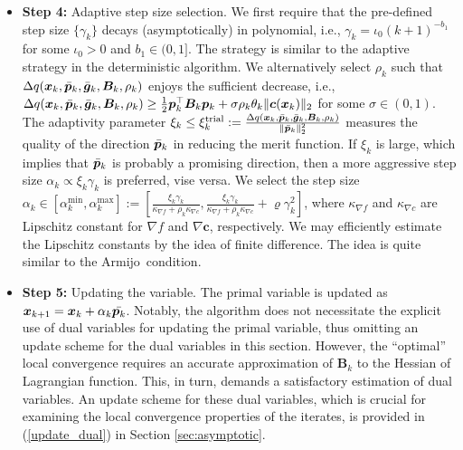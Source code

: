 \documentclass[aos]{imsart}
\numberwithin{equation}{section}
\theoremstyle{plain}
\begin{document}
\begin{itemize}
    \item \textbf{Step 4:} Adaptive step size selection. We first require that the pre-defined step size $\{\gamma_k\}$ decays (asymptotically) in polynomial, i.e., $\gamma_k = \iota_0 \left(k+1 \right)^{-b_1}$ for some $\iota_0 > 0$ and $b_1 \in (0,1]$. 
    The strategy is similar to the adaptive strategy in the deterministic algorithm. We alternatively select $\rho_k$ such that $\Delta q(\bm{x}_k,\Bar{\bm{p}}_k, \Bar{\bm{g}}_k, \bm{B}_k,\rho_k)$ enjoys the sufficient decrease, i.e., $\Delta q(\bm{x}_k,\Bar{\bm{p}}_k, \Bar{\bm{g}}_k, \bm{B}_k,\rho_k) \geq \frac{1}{2} \bm{p}_k^{\top} \bm{B}_k \bm{p}_k + \sigma \rho_k \theta_k \|\bm{c}(\bm{x}_k)\|_2$ for some $\sigma \in (0,1)$. The adaptivity parameter $\xi_k \leq \xi_k^{\text{trial}} := \frac{\Delta q(\bm{x}_k,\Bar{\bm{p}}_k, \Bar{\bm{g}}_k,\bm{B}_k,\rho_k)}{\|\Bar{\bm{p}}_k\|_2^2}$ measures the quality of the direction $\Bar{\bm{p}}_k$ in reducing the merit function. If $\xi_k$ is large, which implies that $\Bar{\bm{p}}_k$ is probably a promising direction, then a more aggressive step size $\alpha_k \propto \xi_k \gamma_k$ is preferred, vise versa. We select the step size  $\alpha_k \in \left[\alpha_k^{\text{min}}, \alpha_k^{\max} \right] :=  \left[ \frac{ \xi_{k}\gamma_k}{\kappa_{\nabla f} + \rho_k \kappa_{\nabla c}} , \frac{ \xi_{k}\gamma_k}{\kappa_{\nabla f} + \rho_k \kappa_{\nabla c}} + \varrho \gamma_k^2 \right]$, where $\kappa_{\nabla f}$ and $\kappa_{\nabla c}$ are Lipschitz constant for $\nabla f$ and $\nabla \bm{c}$, respectively. We may efficiently estimate the Lipschitz constants by the idea of finite difference. The idea is quite similar to the Armijo~condition.

    \item \textbf{Step 5:} Updating the variable. The primal variable is updated as $\bm{x}_{k+1} = \bm{x}_k + \alpha_k \Bar{\bm{p}_k}$. 
    Notably, the algorithm does not necessitate the explicit use of dual variables for updating the primal variable, thus omitting an update scheme for the dual variables in this section.
    However, the ``optimal'' local convergence requires an accurate approximation of $\bm{B}_k$ to the Hessian of Lagrangian function. This, in turn, demands a satisfactory estimation of dual variables. 
    An update scheme for these dual variables, which is crucial for examining the local convergence properties of the iterates, is provided in (\ref{update_dual}) in Section \ref{sec:asymptotic}.
\end{itemize}
\end{document}

